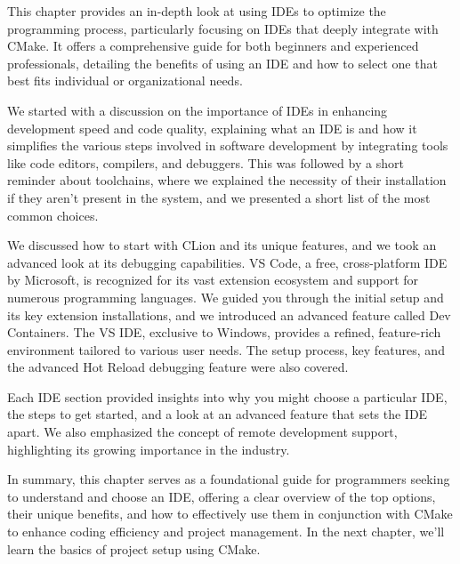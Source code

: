 This chapter provides an in-depth look at using IDEs to optimize the programming process, particularly focusing on IDEs that deeply integrate with CMake. It offers a comprehensive guide for both beginners and experienced professionals, detailing the benefits of using an IDE and how to select one that best fits individual or organizational needs.

We started with a discussion on the importance of IDEs in enhancing development speed and code quality, explaining what an IDE is and how it simplifies the various steps involved in software development by integrating tools like code editors, compilers, and debuggers. This was followed by a short reminder about toolchains, where we explained the necessity of their installation if they aren’t present in the system, and we presented a short list of the most common choices.

We discussed how to start with CLion and its unique features, and we took an advanced look at its debugging capabilities. VS Code, a free, cross-platform IDE by Microsoft, is recognized for its vast extension ecosystem and support for numerous programming languages. We guided you through the initial setup and its key extension installations, and we introduced an advanced feature called Dev Containers. The VS IDE, exclusive to Windows, provides a refined, feature-rich environment tailored to various user needs. The setup process, key features, and the advanced Hot Reload debugging feature were also covered.

Each IDE section provided insights into why you might choose a particular IDE, the steps to get started, and a look at an advanced feature that sets the IDE apart. We also emphasized the concept of remote development support, highlighting its growing importance in the industry.

In summary, this chapter serves as a foundational guide for programmers seeking to understand and choose an IDE, offering a clear overview of the top options, their unique benefits, and how to effectively use them in conjunction with CMake to enhance coding efficiency and project management. In the next chapter, we’ll learn the basics of project setup using CMake.



